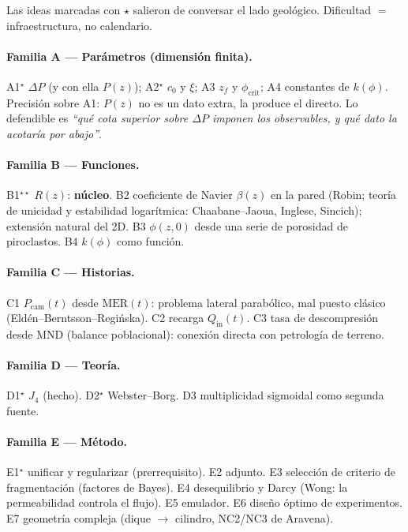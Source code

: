 \documentclass[11pt,a4paper]{article}
\theoremstyle{plain}
\theoremstyle{definition}
\theoremstyle{remark}
\newcommand{\MER}{\mathrm{MER}}
\begin{document}
Las ideas marcadas con $\star$ salieron de conversar el lado
geológico. Dificultad $=$ infraestructura, no calendario.

\paragraph{Familia A --- Parámetros (dimensión finita).}
A1$^\star$ $\Delta P$ (y con ella $P(z)$); A2$^\star$ $c_0$ y
$\xi$; A3 $z_f$ y $\phi_{\mathrm{crit}}$; A4 constantes de
$k(\phi)$. Precisión sobre A1: $P(z)$ no es un dato extra, la
produce el directo. Lo defendible es
\textit{``qué cota superior sobre $\Delta P$ imponen los
observables, y qué dato la acotaría por abajo''}.

\paragraph{Familia B --- Funciones.}
B1$^{\star\star}$ $R(z)$: \textbf{núcleo}. B2 coeficiente de
Navier $\beta(z)$ en la pared (Robin; teoría de unicidad y
estabilidad logarítmica: Chaabane--Jaoua, Inglese, Sincich);
extensión natural del 2D. B3 $\phi(z,0)$ desde una serie de
porosidad de piroclastos. B4 $k(\phi)$ como función.

\paragraph{Familia C --- Historias.}
C1 $P_{\mathrm{cam}}(t)$ desde $\MER(t)$: problema lateral
parabólico, mal puesto clásico (Eldén--Berntsson--Regińska). C2
recarga $Q_{\mathrm{in}}(t)$. C3 tasa de descompresión desde MND
(balance poblacional): conexión directa con petrología de
terreno.

\paragraph{Familia D --- Teoría.}
D1$^\star$ $J_4$ (hecho). D2$^\star$ Webster--Borg. D3
multiplicidad sigmoidal como segunda fuente.

\paragraph{Familia E --- Método.}
E1$^\star$ unificar y regularizar (prerrequisito). E2 adjunto.
E3 selección de criterio de fragmentación (factores de Bayes).
E4 desequilibrio y Darcy (Wong: la permeabilidad controla el
flujo). E5 emulador. E6 diseño óptimo de experimentos. E7
geometría compleja (dique $\to$ cilindro, NC2/NC3 de Aravena).
\end{document}
